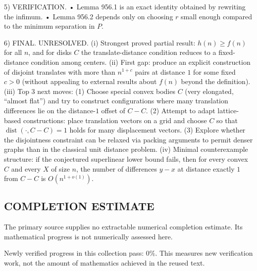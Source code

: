 5) VERIFICATION.
• Lemma 956.1 is an exact identity obtained by rewriting the infimum.
• Lemma 956.2 depends only on choosing $r$ small enough compared to the minimum separation in $P$.

6) FINAL.
UNRESOLVED.
(i) Strongest proved partial result: $h(n)\ge f(n)$ for all $n$, and for disks $C$ the translate-distance condition reduces to a fixed-distance condition among centers.
(ii) First gap: produce an explicit construction of disjoint translates with more than $n^{1+c}$ pairs at distance $1$ for some fixed $c>0$ (without appealing to external results about $f(n)$ beyond the definition).
(iii) Top 3 next moves:
  (1) Choose special convex bodies $C$ (very elongated, “almost flat”) and try to construct configurations where many translation differences lie on the distance-$1$ offset of $C-C$.
  (2) Attempt to adapt lattice-based constructions: place translation vectors on a grid and choose $C$ so that $\operatorname{dist}(\cdot,C-C)=1$ holds for many displacement vectors.
  (3) Explore whether the disjointness constraint can be relaxed via packing arguments to permit denser graphs than in the classical unit distance problem.
(iv) Minimal counterexample structure: if the conjectured superlinear lower bound fails, then for every convex $C$ and every $X$ of size $n$, the number of differences $y-x$ at distance exactly $1$ from $C-C$ is $O(n^{1+o(1)})$.




\subsection*{COMPLETION ESTIMATE}
The primary source supplies no extractable numerical completion estimate. Its mathematical progress is not numerically assessed here.

Newly verified progress in this collection pass: $0\%$. This measures new verification work, not the amount of mathematics achieved in the reused text.

